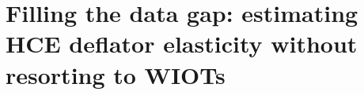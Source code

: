 \documentclass[11pt,a4paper]{paper} %
\begin{document}
%
%
%
%
%
%

\section{Filling the data gap: estimating HCE deflator elasticity without resorting to WIOTs}
\label{sec:extrapo}
\end{document}
